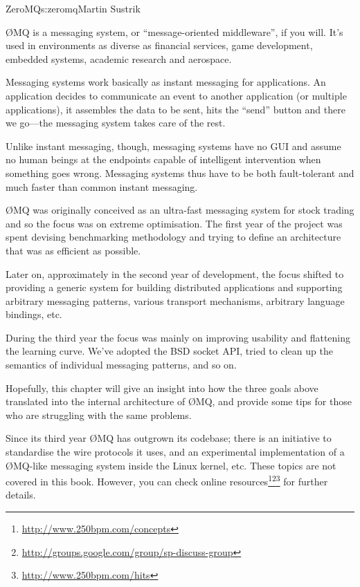 \begin{aosachapter}{ZeroMQ}{s:zeromq}{Martin Sustrik}


{\O}MQ is a messaging system, or ``message-oriented middleware'', if you
will. It's used in environments as diverse as financial services, game
development, embedded systems, academic research and aerospace.

Messaging systems work basically as instant messaging for
applications. An application decides to communicate an event to
another application (or multiple applications), it assembles the data
to be sent, hits the ``send'' button and there we go---the messaging
system takes care of the rest.

Unlike instant messaging, though, messaging systems have no GUI and
assume no human beings at the endpoints capable of intelligent
intervention when something goes wrong. Messaging systems thus have to
be both fault-tolerant and much faster than common instant messaging.

{\O}MQ was originally conceived as an ultra-fast messaging system
for stock trading and so the focus was on extreme optimisation. The
first year of the project was spent devising benchmarking methodology
and trying to define an architecture that was as efficient as possible.

Later on, approximately in the second year of development, the focus
shifted to providing a generic system for building distributed
applications and supporting arbitrary messaging patterns, various
transport mechanisms, arbitrary language bindings, etc.

During the third year the focus was mainly on improving usability and 
flattening the learning curve. We've adopted the BSD socket API, tried to
clean up the semantics of individual messaging patterns, and so on.

Hopefully, this chapter will give an insight into how the three goals
above translated into the internal architecture of {\O}MQ, and provide
some tips for those who are struggling with the same problems.

Since its third year {\O}MQ has outgrown its codebase; there is
an initiative to standardise the wire protocols it uses, and an
experimental implementation of a {\O}MQ-like messaging system inside the Linux
kernel, etc.  These topics are not covered in this book. However, you can check
online
resources\footnote{\url{http://www.250bpm.com/concepts}}\footnote{\url{http://groups.google.com/group/sp-discuss-group}}\footnote{\url{http://www.250bpm.com/hits}}
for further details.


\end{aosachapter}
